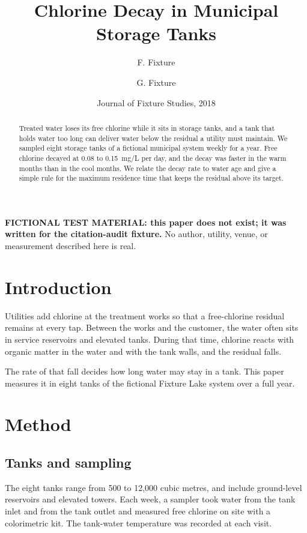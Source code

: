 \documentclass{article}
\title{Chlorine Decay in Municipal Storage Tanks}
\author{F. Fixture \and G. Fixture}
\date{Journal of Fixture Studies, 2018}
\begin{document}
\maketitle

\noindent\textbf{FICTIONAL TEST MATERIAL: this paper does not exist; it was
written for the citation-audit fixture.} No author, utility, venue, or
measurement described here is real.

\begin{abstract}
Treated water loses its free chlorine while it sits in storage tanks, and a
tank that holds water too long can deliver water below the residual a utility
must maintain. We sampled eight storage tanks of a fictional municipal system
weekly for a year. Free chlorine decayed at 0.08 to 0.15~mg/L per day, and the
decay was faster in the warm months than in the cool months. We relate the
decay rate to water age and give a simple rule for the maximum residence time
that keeps the residual above its target.
\end{abstract}

\section{Introduction}
\label{sec:introduction}

Utilities add chlorine at the treatment works so that a free-chlorine residual
remains at every tap. Between the works and the customer, the water often sits
in service reservoirs and elevated tanks. During that time, chlorine reacts
with organic matter in the water and with the tank walls, and the residual
falls.

The rate of that fall decides how long water may stay in a tank. This paper
measures it in eight tanks of the fictional Fixture Lake system over a full
year.

\section{Method}
\label{sec:method}

\subsection{Tanks and sampling}
\label{sec:method-sampling}

The eight tanks range from 500 to 12,000 cubic metres, and include ground-level
reservoirs and elevated towers. Each week, a sampler took water from the tank
inlet and from the tank outlet and measured free chlorine on site with a
colorimetric kit. The tank-water temperature was recorded at each visit.
\end{document}

